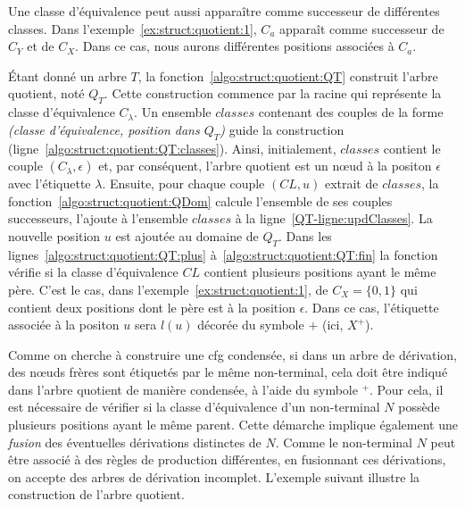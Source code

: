 \begin{remark}
    Une classe d'équivalence peut aussi apparaître comme successeur de différentes classes.
    Dans l'exemple~\ref{ex:struct:quotient:1}, $C_a$ apparaît comme successeur de $C_Y$ et de $C_X$.
    Dans ce cas, nous aurons différentes positions associées à $C_a$.
\end{remark}

Étant donné un arbre $T$, la fonction~\ref{algo:struct:quotient:QT} construit l'arbre quotient, noté $Q_T$.
Cette construction commence par la racine qui représente la classe d'équivalence $C_{\lambda}$.
Un ensemble $classes$ contenant des couples de la forme \textit{(classe d'équivalence, position dans $Q_T$)} guide la construction (ligne~\ref{algo:struct:quotient:QT:classes}).
Ainsi, initialement, $classes$ contient le couple $(C_{\lambda}, \epsilon)$ et, par conséquent, l'arbre quotient est un nœud à la positon $\epsilon$ avec l'étiquette $\lambda$.
Ensuite, pour chaque couple $(CL, u)$ extrait de $classes$, la fonction~\ref{algo:struct:quotient:QDom} calcule l'ensemble de ses couples successeurs, l'ajoute à l'ensemble $classes$ à la ligne~\ref{QT-ligne:updClasses}.
La nouvelle position $u$ est ajoutée au domaine de $Q_T$.
Dans les lignes~\ref{algo:struct:quotient:QT:plus} à~\ref{algo:struct:quotient:QT:fin} la fonction vérifie si la classe d'équivalence $CL$ contient plusieurs positions ayant le même père.
C'est le cas, dans l'exemple~\ref{ex:struct:quotient:1}, de $C_X=\{0, 1\}$ qui contient deux positions dont le père est à la position $\epsilon$.
Dans ce cas, l'étiquette associée à la positon $u$ sera $l(u)$ décorée du symbole $+$ (ici, $X^+$).

Comme on cherche à construire une \gls{cfg} condensée, si dans un arbre de dérivation, des nœuds frères sont étiquetés par le même non-terminal, cela doit être indiqué dans l'arbre quotient de manière condensée, à l'aide du symbole ${}^+$.
Pour cela, il est nécessaire de vérifier si la classe d'équivalence d'un non-terminal $N$ possède plusieurs positions ayant le même parent.
Cette démarche implique également une \textit{fusion} des éventuelles dérivations distinctes de $N$.
Comme le non-terminal $N$ peut être associé à des règles de production différentes, en fusionnant ces dérivations, on accepte des arbres de dérivation incomplet.
L'exemple suivant illustre la construction de l'arbre quotient.

